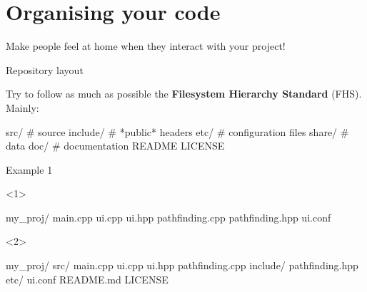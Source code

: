 \documentclass[compress]{beamer}
\begin{document}
\section[Organising]{Organising your code}

\begin{frame}{}
    \centering


    Make people feel at home when they interact with your project!

\end{frame}

\begin{frame}[fragile, label=FHS]{Repository layout}

Try to follow as much as possible the {\bf Filesystem Hierarchy
 Standard} (FHS). Mainly:

\begin{shcode}
src/        # source
include/    # *public* headers
etc/        # configuration files
share/      # data
doc/        # documentation
README
LICENSE
\end{shcode}

\centering


\end{frame}


\begin{frame}[fragile]{Example 1}

\begin{onlyenv}<1>
\begin{shcode}
my_proj/
  main.cpp
  ui.cpp
  ui.hpp
  pathfinding.cpp
  pathfinding.hpp
  ui.conf
\end{shcode}

\end{onlyenv}

\begin{onlyenv}<2>
\begin{shcode}
my_proj/
  src/
    main.cpp
    ui.cpp
    ui.hpp
    pathfinding.cpp
  include/
    pathfinding.hpp
  etc/
    ui.conf
  README.md
  LICENSE
\end{shcode}

\end{onlyenv}

\end{frame}
\end{document}
